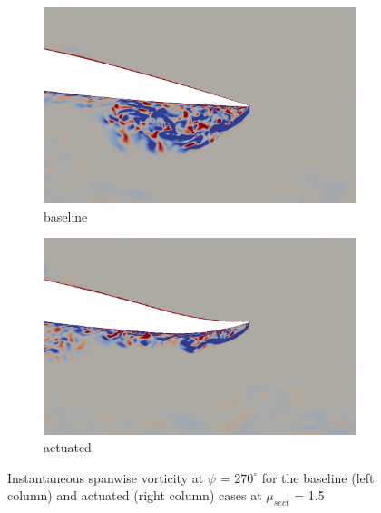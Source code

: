 \begin{figure}[H]
	\centering
	
	\begin{subfigure}[b]{0.4\textwidth}
		\centering
		\includegraphics[width=1\textwidth]{figures/mu_1pt5/baseline/ph_270_vorticity_zoomed_airfoil.png}
		\caption{ baseline}
		\label{fig:mu_1pt5_baseline_zoomed_vorticity}
	\end{subfigure}
	\begin{subfigure}[b]{0.4\textwidth}
		\centering
		\includegraphics[width=1\textwidth]{figures/mu_1pt5/AC/ph_270_vorticity_zoomed_airfoil.png}
		\caption{actuated}
		\label{fig:mu_1pt5_AC_zoomed_vorticity}
	\end{subfigure}
	\caption{Instantaneous spanwise vorticity at $\psi$ = $270^\circ$ for the baseline (left column) and actuated (right column) cases at $\mu_{sect}$ = 1.5}
	\label{fig:mu_1pt5_zoomed_vorticity}
\end{figure}

